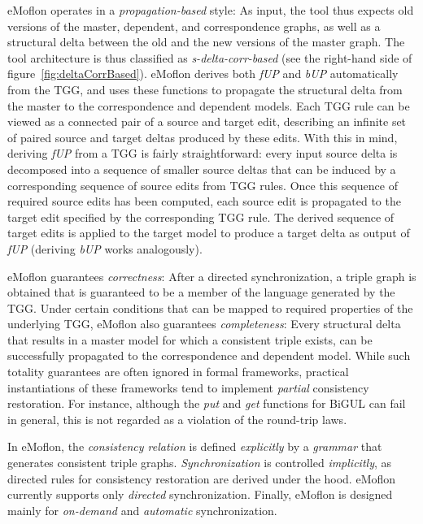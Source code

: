 eMoflon operates in a \emph{propagation-based} style: As input, the tool thus expects old versions of the master, dependent, and correspondence graphs, as well as a structural delta between the old and the new versions of the master graph.
The tool architecture is thus classified as \emph{s-delta-corr-based} (see the right-hand side of figure~\ref{fig:deltaCorrBased}).
eMoflon derives both \emph{fUP} and \emph{bUP} automatically from the TGG, and uses these functions to propagate the structural delta from the master to the correspondence and dependent models.
Each TGG rule can be viewed as a connected pair of a source and target edit, describing an infinite set of paired source and target deltas produced by these edits.
With this in mind, deriving \emph{fUP} from a TGG is fairly straightforward: every input source delta is decomposed into a sequence of smaller source deltas that can be induced by a corresponding sequence of source edits from TGG rules.
Once this sequence of required source edits has been computed, each source edit is propagated to the target edit specified by the corresponding TGG rule.
The derived sequence of target edits is applied to the target model to produce a target delta as output of \emph{fUP} (deriving \emph{bUP} works analogously).

eMoflon guarantees \emph{correctness}: After a directed synchronization, a triple graph is obtained that  is guaranteed to be a member of the language generated by the TGG.
Under certain conditions that can be mapped to required properties of the underlying TGG, eMoflon also guarantees \emph{completeness}: Every structural delta that results in a master model for which a consistent triple exists, can be successfully propagated to the correspondence and dependent model.
While such totality guarantees are often ignored in formal frameworks, practical instantiations of these frameworks tend to implement \emph{partial} consistency restoration.
For instance, although the \emph{put} and \emph{get} functions for BiGUL can fail in general, this is not regarded as a violation of the round-trip laws.

In eMoflon, the \emph{consistency relation} is defined \emph{explicitly} by a \emph{grammar} that generates consistent triple graphs.
\emph{Synchronization} is controlled \emph{implicitly}, as directed rules for consistency restoration are derived under the hood.
eMoflon currently supports only \emph{directed} synchronization.
Finally, eMoflon is designed mainly for \emph{on-demand} and \emph{automatic} synchronization.


